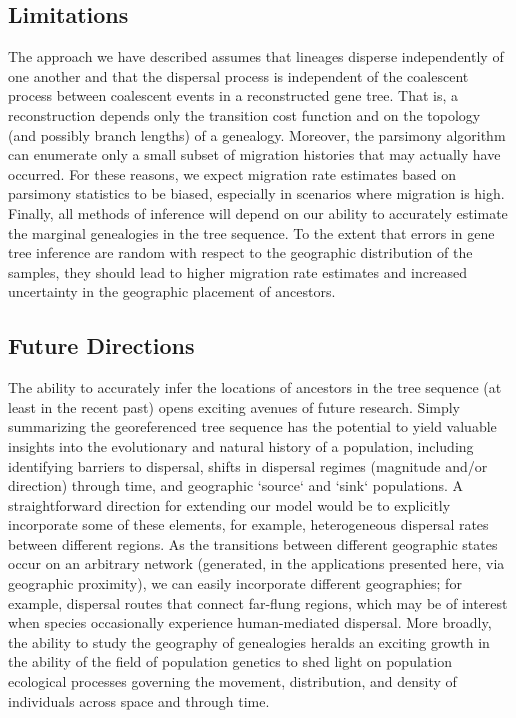 

\subsection{Limitations}

The approach we have described assumes that lineages disperse
independently of one another and that the dispersal process is independent of
the coalescent process between coalescent events in a reconstructed gene tree. 
That is, a reconstruction depends only the transition cost function and on the 
topology (and possibly branch lengths) of a genealogy. Moreover, the parsimony 
algorithm can enumerate only a small subset of migration histories that may 
actually have occurred. For these reasons, we expect migration rate estimates 
based on parsimony statistics to be biased, especially in scenarios where 
migration is high. Finally, all methods of inference will depend on our
ability to accurately estimate the marginal genealogies in the tree
sequence. To the extent that errors in gene tree inference are random with
respect to the geographic distribution of the samples, they should lead to
higher migration rate estimates and increased uncertainty in the geographic
placement of ancestors.

\subsection{Future Directions}

The ability to accurately infer the locations of ancestors in the tree sequence 
(at least in the recent past) 
opens exciting avenues of future research.
Simply summarizing the georeferenced tree sequence has the potential 
to yield valuable insights into the evolutionary and natural history of a population, 
including identifying barriers to dispersal, 
shifts in dispersal regimes (magnitude and/or direction) through time, 
and geographic `source` and `sink` populations.
A straightforward direction for extending our model would be to explicitly 
incorporate some of these elements,
for example, heterogeneous dispersal rates between different regions.
As the transitions between different geographic states occur on an arbitrary network
(generated, in the applications presented here, via geographic proximity), 
we can easily incorporate different geographies; 
for example, dispersal routes that connect far-flung regions, 
which may be of interest when species occasionally experience 
human-mediated dispersal.
More broadly, the ability to study the geography of genealogies
heralds an exciting growth in the ability of the field of population genetics 
to shed light on population ecological processes governing the movement, 
distribution, and density of individuals across space and through time. 
